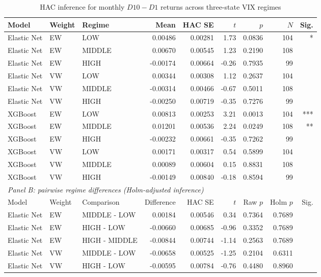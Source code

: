 \begin{table}[htbp]
\centering
\caption{HAC inference for monthly $D10-D1$ returns across three-state VIX regimes}
\label{tab:long-short-inference}
\small
\begin{tabular}{lllrrrrrr}
\hline
Model & Weight & Regime & Mean & HAC SE & $t$ & $p$ & $N$ & Sig. \\
\hline
Elastic Net & EW & LOW & 0.00486 & 0.00281 & 1.73 & 0.0836 & 104 & * \\
Elastic Net & EW & MIDDLE & 0.00670 & 0.00545 & 1.23 & 0.2190 & 108 &  \\
Elastic Net & EW & HIGH & -0.00174 & 0.00664 & -0.26 & 0.7935 & 99 &  \\
Elastic Net & VW & LOW & 0.00344 & 0.00308 & 1.12 & 0.2637 & 104 &  \\
Elastic Net & VW & MIDDLE & -0.00314 & 0.00466 & -0.67 & 0.5011 & 108 &  \\
Elastic Net & VW & HIGH & -0.00250 & 0.00719 & -0.35 & 0.7276 & 99 &  \\
XGBoost & EW & LOW & 0.00813 & 0.00253 & 3.21 & 0.0013 & 104 & *** \\
XGBoost & EW & MIDDLE & 0.01201 & 0.00536 & 2.24 & 0.0249 & 108 & ** \\
XGBoost & EW & HIGH & -0.00232 & 0.00661 & -0.35 & 0.7262 & 99 &  \\
XGBoost & VW & LOW & 0.00171 & 0.00317 & 0.54 & 0.5899 & 104 &  \\
XGBoost & VW & MIDDLE & 0.00089 & 0.00604 & 0.15 & 0.8831 & 108 &  \\
XGBoost & VW & HIGH & -0.00149 & 0.00840 & -0.18 & 0.8594 & 99 &  \\
\hline
\multicolumn{9}{l}{\textit{Panel B: pairwise regime differences (Holm-adjusted inference)}} \\
Model & Weight & Comparison & Difference & HAC SE & $t$ & Raw $p$ & Holm $p$ & Sig. \\
\hline
Elastic Net & EW & MIDDLE - LOW & 0.00184 & 0.00546 & 0.34 & 0.7364 & 0.7689 &  \\
Elastic Net & EW & HIGH - LOW & -0.00660 & 0.00685 & -0.96 & 0.3352 & 0.7689 &  \\
Elastic Net & EW & HIGH - MIDDLE & -0.00844 & 0.00744 & -1.14 & 0.2563 & 0.7689 &  \\
Elastic Net & VW & MIDDLE - LOW & -0.00658 & 0.00525 & -1.25 & 0.2104 & 0.6311 &  \\
Elastic Net & VW & HIGH - LOW & -0.00595 & 0.00784 & -0.76 & 0.4480 & 0.8960 &  \\

\end{tabular}
\end{table}
